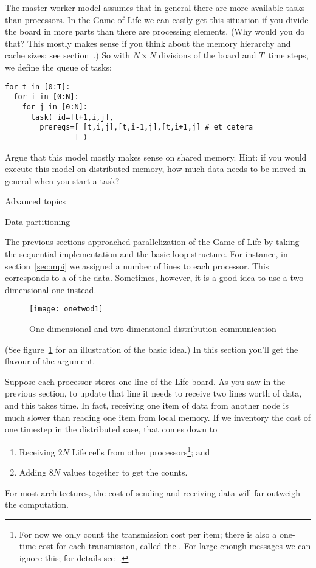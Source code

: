 The master-worker model assumes that in general there are more
available tasks than processors. In the Game of Life we can easily get
this situation if you divide the board in more parts than there
are processing elements. (Why would you do that? This mostly makes
sense if you think about the memory hierarchy and cache sizes; see
section~.) So with
$N\times N$ divisions of the board and $T$~time steps, we define the queue
of tasks:
\begin{verbatim}
for t in [0:T]:
  for i in [0:N]:
    for j in [0:N]:
      task( id=[t+1,i,j], 
        prereqs=[ [t,i,j],[t,i-1,j],[t,i+1,j] # et cetera
                ] )
\end{verbatim}

\begin{exercise}
  Argue that this model mostly makes sense on shared memory. Hint: if
  you would execute this model on distributed memory, how much data
  needs to be moved in general when you start a task?
\end{exercise}

 {Advanced topics}

 {Data partitioning}
\label{sec:distribution}

The previous sections approached parallelization of the
Game of Life by taking the sequential implementation
and the basic loop structure. For instance, in
section~\ref{sec:mpi} we assigned a number of lines to each 
processor. This corresponds to a 
of the data.
Sometimes, however, it is a good idea to use a two-dimensional
one instead.
\begin{figure}[t]
  \texttt{[image: onetwod1]}
  \caption{One-dimensional and two-dimensional distribution communication}
  \label{fig:onetwod1}
\end{figure}
(See figure~\ref{fig:onetwod1} for an illustration 
of the basic idea.) In this section you'll get the
flavour of the argument.

Suppose each processor stores one line of the Life board. 
As you saw in the previous section, to update that line it needs to receive
two lines worth of data, and this takes time.
In fact, receiving one item of data from another node is much slower
than reading one item from local memory. If we inventory the cost 
of one timestep in the distributed case, that comes down to
\begin{enumerate}
\item Receiving $2N$ Life cells from other processors\footnote{For now
  we only count the transmission cost per item; there is also a
  one-time cost for each transmission, called the . For large enough messages we
  can ignore this; for details see~.}; and
\item Adding $8N$ values together to get the counts.
\end{enumerate}
For most architectures, the cost of sending and receiving data will
far outweigh the computation.

